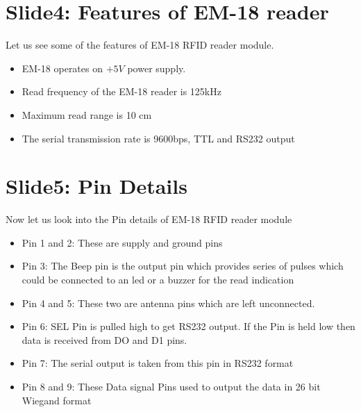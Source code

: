 \documentclass[a4paper,29.6pt]{article}
\begin{document}
\section{Slide4: Features of EM-18 reader}
\begin{small}
Let us see some of the features of EM-18 RFID reader module.
\begin{itemize}
\item EM-18 operates on $+5V$ power supply. 
\item Read frequency of the EM-18 reader is 125kHz
\item Maximum read range is 10 cm
\item The serial transmission rate is 9600bps, TTL and RS232 output
\end{itemize}

\end{small}




\section{Slide5: Pin Details}
\begin{small}
Now let us look into the Pin details of EM-18 RFID reader module
\begin{itemize}
\item Pin 1 and 2: These are supply and ground pins
\item Pin 3: The Beep pin is the output pin which provides series of pulses which could be connected to an led or a buzzer for the read indication
\item Pin 4 and 5: These two are antenna pins which are left unconnected.
\item Pin 6: SEL Pin is pulled high to get RS232 output. If the Pin is held low then data is received from DO and D1 pins.
\item Pin 7: The serial output is taken from this pin in RS232 format
\item Pin 8 and 9: These Data signal Pins used to output the data in 26 bit Wiegand format
\end{itemize}
\end{small}
\end{document}
